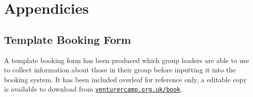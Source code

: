 \documentclass[a4paper, 11pt]{report}
\begin{document}
    \tableofcontents
    
    
    
    
    

    \part*{Appendicies}
    \appendix
    

    \chapter{Template Booking Form}
    A template booking form has been produced which group leaders are able to use to collect information about those in their group before inputting it into the booking system. It has been included overleaf for reference only, a editable copy is available to download from \href{https://venturercamp.org.uk/book}{\texttt{venturercamp.org.uk/book}}.
    

    \backPage
\end{document}
